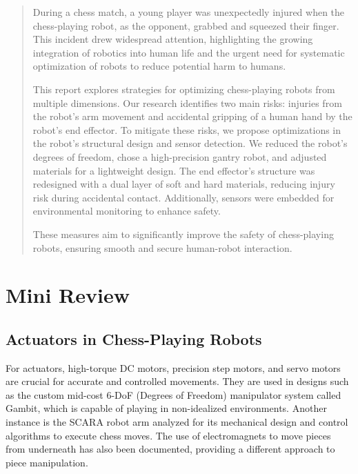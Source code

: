 \documentclass[10pt, a4paper, twocolumn]{article}
\begin{document}
\begin{abstract}
During a chess match, a young player was unexpectedly injured when the chess-playing robot, as the opponent, grabbed and squeezed their finger. This incident drew widespread attention, highlighting the growing integration of robotics into human life and the urgent need for systematic optimization of robots to reduce potential harm to humans. 

This report explores strategies for optimizing chess-playing robots from multiple dimensions. Our research identifies two main risks: injuries from the robot's arm movement and accidental gripping of a human hand by the robot's end effector. To mitigate these risks, we propose optimizations in the robot's structural design and sensor detection. We reduced the robot's degrees of freedom, chose a high-precision gantry robot, and adjusted materials for a lightweight design. The end effector's structure was redesigned with a dual layer of soft and hard materials, reducing injury risk during accidental contact. Additionally, sensors were embedded for environmental monitoring to enhance safety. 

These measures aim to significantly improve the safety of chess-playing robots, ensuring smooth and secure human-robot interaction.
\end{abstract}

\section{Mini Review}

\subsection{Actuators in Chess-Playing Robots}
For actuators, high-torque DC motors, precision step motors, and servo motors are crucial for accurate and controlled movements. They are used in designs such as the custom mid-cost 6-DoF (Degrees of Freedom) manipulator system called Gambit, which is capable of playing in non-idealized environments\cite{Gambit}. Another instance is the SCARA robot arm analyzed for its mechanical design and control algorithms to execute chess moves\cite{anh2016design}. The use of electromagnets to move pieces from underneath has also been documented, providing a different approach to piece manipulation\cite{chess_playing_robot_vub}.
\end{document}
